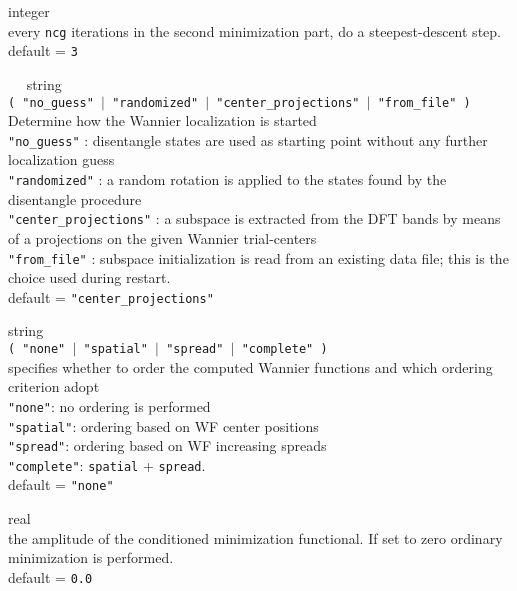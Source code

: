{\noindent{}%
{\sc integer} \\ every {\tt ncg} iterations in the second minimization part,
do a steepest-descent step.\\ {\sc default} = {\tt 3 }\par

\noindent{}%
{\sc $\quad$ string} \\
{\tt ( "no\_guess" $\mid$ "randomized" $\mid$ "center\_projections"
$\mid$ "from\_file" )}\\
 Determine how the Wannier localization is started\\
{\tt "no\_guess"} : disentangle states are used as starting point
                 without any further localization guess\\
{\tt "randomized"} : a random rotation is applied to the states found by
                 the disentangle procedure\\
{\tt "center\_projections"} : a subspace is extracted from the DFT bands
                 by means of a projections on the given Wannier trial-centers \\
{\tt "from\_file"} : subspace initialization is read from an existing data file;
                 this is the choice used during restart. \\
{\sc default} = {\tt "center\_projections"} \par

\noindent{}%
{\sc string} \\ {\tt ( "none" $\mid$ "spatial" $\mid$ "spread" $\mid$ "complete" ) } \\
specifies whether to order the computed Wannier functions and
              which ordering criterion adopt\\
{\tt "none"}:      no ordering is performed\\
{\tt "spatial"}:   ordering based on WF center positions\\
{\tt "spread"}:    ordering based on WF increasing spreads\\
{\tt "complete"}:  {\tt spatial} + {\tt spread}. \\
{\sc default} = {\tt "none" }\par

\noindent{}%
{\sc real} \\ the amplitude of the conditioned minimization functional. If set to zero
              ordinary minimization is performed.\\
{\sc default} = {\tt 0.0} \par

}

